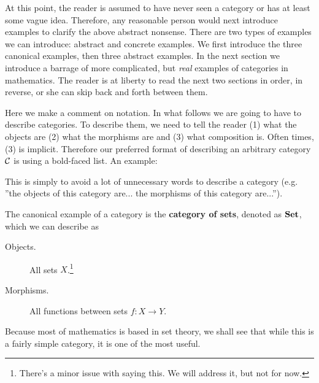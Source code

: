     At this point, the reader is assumed to have never seen a category or has at least 
    some vague idea. Therefore, any reasonable person would next introduce examples 
    to clarify the above abstract nonsense.
    There are two types of examples we can 
    introduce: abstract and concrete examples. We first introduce the three canonical examples, 
    then three abstract examples.
    In the next section we introduce a barrage of more complicated, but 
    \emph{real} examples of categories in mathematics. 
    The reader is at liberty to read the next two sections in order, in reverse, or she can skip 
    back and forth between them. 

    Here we make a comment on notation. In what follows we are going to have to describe 
    categories. To describe them, we need to tell the reader (1) what the objects are 
    (2) what the morphisms are and (3) what composition is. Often times, (3) is implicit. 
    Therefore our preferred format of describing an arbitrary 
    category $\mathcal{C}$ is using a bold-faced list. 
    An example:
    \begin{center}
    \end{center}
    This is simply to avoid a lot of unnecessary 
    words to describe a category (e.g. ''the objects of this category are... the morphisms of this category are...'').

    \begin{example}
        The canonical example of a category is the \textbf{category of sets}, denoted 
        as $\operatorname{\mathbf{Set}}$, which we can describe as 
        \begin{description}
            \item[Objects.] All sets $X$.\footnote{There's a minor issue with saying this. We will address it, but not for now.} 
            \item[Morphisms.] All functions between sets $f: X \to Y$. 
        \end{description}
        Because most of mathematics is based in set theory, we shall see that while this is a fairly 
        simple category, it is one of the most useful. 
    \end{example}

